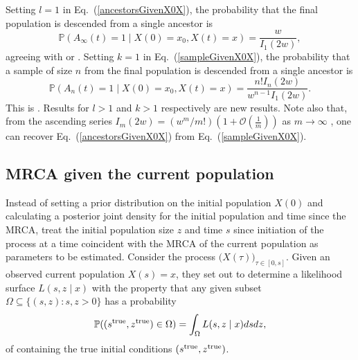 \documentclass[preprint,12pt]{elsarticle}
\begin{document}
Setting $l = 1$ in Eq.~(\ref{ancestorsGivenX0X}), the probability that the final population is descended from a single ancestor is 
\begin{equation}	\label{1AncestorGivenX0X}
\mathbb{P}(A_\infty(t)  = 1 \mid X(0) = x_0, X(t) = x) = \frac{w}{I_1(2w)},  
\end{equation}
agreeing with \citet[Eq.~(44)]{burden2016genetic} or \citet[Corollary~1]{BurdenSoewongsoso19}.  
Setting $k = 1$ in Eq.~(\ref{sampleGivenX0X}), the probability that a sample of size $n$ from the final population is descended from a single ancestor is 
\[
\mathbb{P}(A_n(t)  = 1 \mid X(0) = x_0, X(t) = x) = \frac{n!I_n(2w)}{w^{n - 1}I_1(2w)}.  
\]
This is \citet[Theorem~1]{BurdenSoewongsoso19}.  Results for $l > 1$ and $k > 1$ respectively are new results.  
Note also that, from the ascending series $I_m(2w) = (w^m/m!)(1 + \mathcal{O}(\tfrac{1}{m}))$ as 
$m \to \infty$ \citep[p375]{Abramowitz:1965sf}, one can recover Eq.~(\ref{ancestorsGivenX0X}) from Eq.~(\ref{sampleGivenX0X}).  

%

\subsection{MRCA given the current population}
\label{sec:MRCAfromBSandBS}

Instead of setting a prior distribution on the initial population $X(0)$ and calculating a posterior joint density for the initial population and time since the MRCA, 
\cite{BurdenSoewongsoso19} treat the initial population size $z$ and time $s$ since initiation of the process at a time coincident with the MRCA of the current 
population as parameters to be estimated.  Consider the process $\big(X(\tau)\big)_{\tau \in [0, s]}$.  Given an observed current population $X(s) = x$, 
they set out to determine a likelihood surface $L(s, z \mid x)$ with the property that any given subset $\Omega \subseteq \{(s, z) : s, z > 0\}$ has a probability  
\[
\mathbb{P}((s^{\rm true}, z^{\rm true}) \in \Omega) = \int_\Omega L(s, z \mid x) ds dz , 
\]
of containing the true initial conditions $(s^{\rm true}, z^{\rm true})$.
\end{document}
